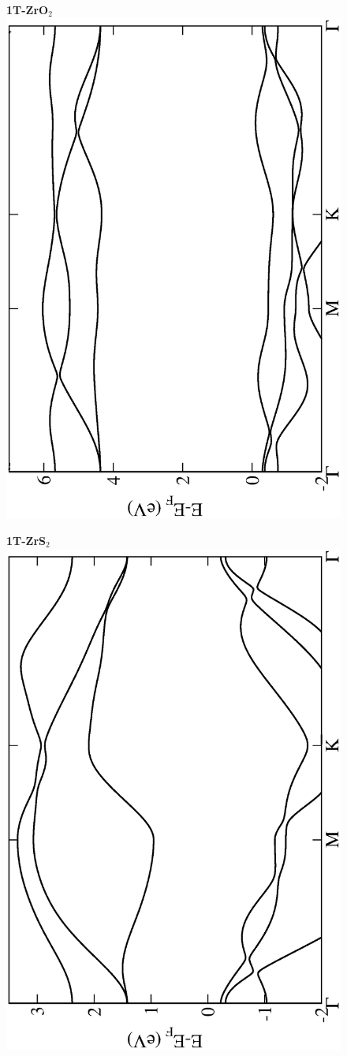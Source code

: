 \begin{figure}[htbp]
  \centering
  {\bfseries \sffamily 1T-ZrO$_{2}$}\\
\includegraphics[width=0.45\linewidth, angle=-90, trim={2.9cm, 0cm, 2cm, 0cm}, clip]{img/SI_figs/BS/1T-ZrO2.eps}
\end{figure}

\begin{figure}[htbp]
\centering
{\bfseries \sffamily 1T-ZrS$_{2}$}\\
\includegraphics[width=0.45\linewidth, angle=-90, trim={2.9cm, 0cm, 2cm, 0cm}, clip]{img/SI_figs/BS/1T-ZrS2.eps}
\end{figure}

